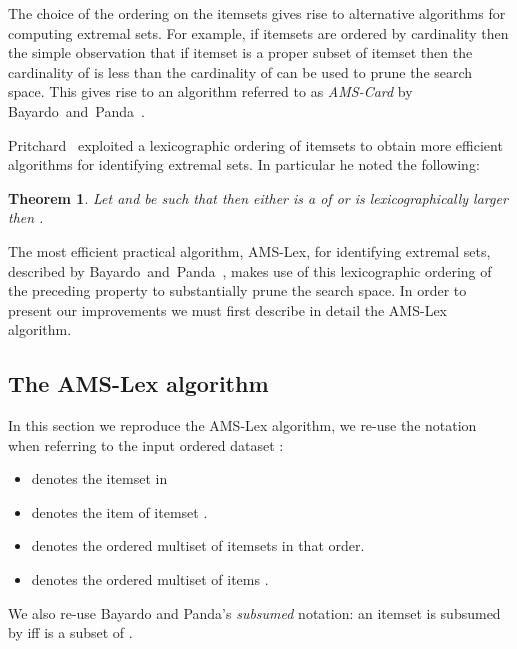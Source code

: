 \documentclass[13pt,a4paper]{article}
\newtheorem{theorem}{Theorem}[section]
\begin{document}
The choice of the ordering on the itemsets gives rise to alternative algorithms for computing extremal sets. For example, if itemsets are ordered by cardinality then the simple observation that if itemset  is a proper subset of itemset  then the cardinality of  is less than the cardinality of  can be used to prune the search space. This gives rise to an algorithm referred to as \textit{AMS-Card} by Bayardo~and~Panda~\cite{BayardoPanda11}.

Pritchard~\cite{Pritchard97} exploited a lexicographic ordering of itemsets to obtain more efficient algorithms for identifying extremal sets. In particular he noted the following:

\begin{theorem}
\label{th:lex}
Let  and  be  such that  then either  is a   of  or  is lexicographically larger then .
\end{theorem}

The most efficient practical algorithm, AMS-Lex, for identifying extremal sets, described by Bayardo~and~Panda~\cite{BayardoPanda11}, makes use of this lexicographic ordering of the preceding property to substantially prune the search space. In order to present our improvements we must first describe in detail the AMS-Lex algorithm.





\subsection{The AMS-Lex algorithm}
\label{sec:background:ams-lex}

In this section we reproduce the AMS-Lex algorithm, we re-use the notation \cite{BayardoPanda11} when referring to the input ordered dataset :

\begin{itemize}
    \item  denotes the  itemset in 
    \item  denotes the  item of itemset .
    \item  denotes the ordered multiset of itemsets  in that order.
    \item  denotes the ordered multiset of items .
\end{itemize}

We also re-use Bayardo and Panda's \textit{subsumed} notation: an itemset  is subsumed by  iff  is a subset of .
\end{document}
